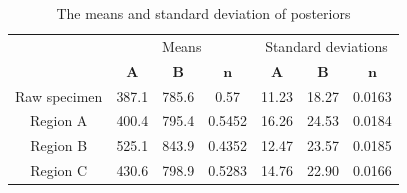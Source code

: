 \documentclass[review]{elsarticle}
\begin{document}
\begin{table}[h!]
\centering
\caption{The means and standard deviation of posteriors}
\begin{tabular}{c c c c c c c} 
 \hline
  & \multicolumn{3}{c}{Means} & \multicolumn{3}{c}{Standard deviations} \\
 \cline{2-7}
  & $\mathbf{A}$ & $\mathbf{B}$ & $\mathbf{n}$ & $\mathbf{A}$ & $\mathbf{B}$ & $\mathbf{n}$\\
  \hline
 Raw specimen & 387.1 & 785.6 & 0.57 & 11.23 & 18.27 & 0.0163\\
 Region A & 400.4 & 795.4 & 0.5452 & 16.26 & 24.53 & 0.0184\\
 Region B & 525.1 & 843.9 & 0.4352 & 12.47 & 23.57 & 0.0185\\
 Region C & 430.6 & 798.9 & 0.5283 & 14.76 & 22.90 & 0.0166\\
 \hline
\end{tabular}
\label{table:results}
\end{table}
\end{document}
